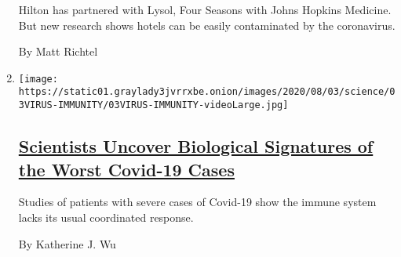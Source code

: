 \begin{enumerate}
  Hilton has partnered with Lysol, Four Seasons with Johns Hopkins
  Medicine. But new research shows hotels can be easily contaminated by
  the coronavirus.

  By Matt Richtel
\item
  \texttt{[image: https://static01.graylady3jvrrxbe.onion/images/2020/08/03/science/03VIRUS-IMMUNITY/03VIRUS-IMMUNITY-videoLarge.jpg]}

  \hypertarget{scientists-uncover-biological-signatures-of-the-worst-covid-19-cases}{%
  \subsection{\texorpdfstring{\href{/2020/08/04/health/coronavirus-immune-system.html}{Scientists
  Uncover Biological Signatures of the Worst Covid-19
  Cases}}{Scientists Uncover Biological Signatures of the Worst Covid-19 Cases}}\label{scientists-uncover-biological-signatures-of-the-worst-covid-19-cases}}

  Studies of patients with severe cases of Covid-19 show the immune
  system lacks its usual coordinated response.

  By Katherine J. Wu
\end{enumerate}

